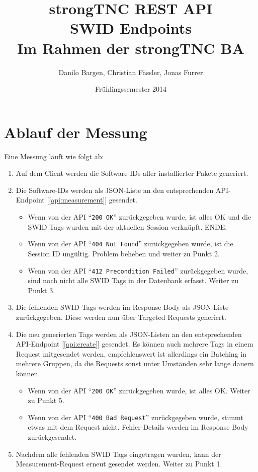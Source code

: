 \documentclass[10pt,a4paper]{scrartcl}
\author{Danilo Bargen, Christian Fässler, Jonas Furrer}
\title{strongTNC REST API\\SWID Endpoints \\ \small{Im Rahmen der strongTNC BA} }
\date{Frühlingssemester 2014}
\begin{document}
\begin{titlepage}
	\maketitle
	\vspace{120mm}
	\thispagestyle{empty} %
\end{titlepage}

\newpage
	\tableofcontents
\newpage

\section{Ablauf der Messung}

Eine Messung läuft wie folgt ab:

\begin{enumerate}
	\item Auf dem Client werden die Software-IDs aller installierter Pakete generiert.
	\item Die Software-IDs werden als JSON-Liste an den entsprechenden
		API-Endpoint [\ref{api:measurement}] gesendet.
	\begin{itemize}
		\item Wenn von der API ``\texttt{200 OK}'' zurückgegeben wurde, ist alles OK und die SWID
			Tags wurden mit der aktuellen Session verknüpft. ENDE.
		\item Wenn von der API ``\texttt{404 Not Found}'' zurückgegeben wurde, ist
			die Session ID ungültig. Problem beheben und weiter zu Punkt 2.
		\item Wenn von der API ``\texttt{412 Precondition Failed}'' zurückgegeben wurde, sind
			noch nicht alle SWID Tags in der Datenbank erfasst. Weiter zu Punkt 3.
	\end{itemize}
	\item Die fehlenden SWID Tags werden im Response-Body als JSON-Liste
		zurückgegeben. Diese werden nun über Targeted Requests generiert.
	\item Die neu generierten Tags werden als JSON-Listen an den entsprechenden
		API-Endpoint [\ref{api:create}] gesendet. Es können auch mehrere Tags in
		einem Request mitgesendet werden, empfehlenswert ist allerdings ein
		Batching in mehrere Gruppen, da die Requests sonst unter Umständen sehr
		lange dauern können.
	\begin{itemize}
		\item Wenn von der API ``\texttt{200 OK}'' zurückgegeben wurde, ist alles
			OK. Weiter zu Punkt 5.
		\item Wenn von der API ``\texttt{400 Bad Request}'' zurückgegeben wurde,
			stimmt etwas mit dem Request nicht. Fehler-Details werden im Response Body
			zurückgesendet.
	\end{itemize}
	\item Nachdem alle fehlenden SWID Tags eingetragen wurden, kann der
		Measurement-Request erneut gesendet werden. Weiter zu Punkt 1.
\end{enumerate}
\end{document}
